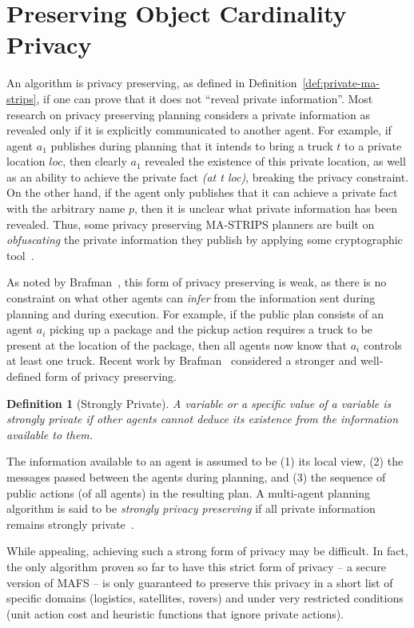 \documentclass[letterpaper]{article}
\newtheorem{definition}{Definition}
\theoremstyle{definition}
\begin{document}
\section{Preserving Object Cardinality Privacy }
\label{sec:preserving}

An algorithm is privacy preserving, as defined in Definition~\ref{def:private-ma-strips}, if one can prove that it does not ``reveal private information''. Most research on privacy preserving planning considers a private information as revealed only if it is explicitly communicated to another agent. For example, if agent $a_1$ publishes during planning that it intends to bring a truck $t$ to a private location $loc$, then clearly $a_1$ revealed the existence of this private location, as well as an ability to achieve the private fact {\em (at t loc)}, breaking  the privacy constraint. On the other hand, if the agent only publishes that it can achieve a private fact with the arbitrary name $p$, then it is unclear what private information has been revealed. Thus, some privacy preserving MA-STRIPS planners are built on {\em obfuscating} the private information they publish by applying some cryptographic tool~\cite{luis2014planMerging,Luis2015PMR,Borrajo2015MAPR_CMAP}.

As noted by Brafman~, this form of privacy preserving is weak, as there is no constraint on what other agents can {\em infer} from the information sent during planning and during execution. For example, if the public plan consists of an agent $a_i$ picking up a package and the pickup action requires a truck to be present at the location of the package, then all agents now know that $a_i$ controls at least one truck. Recent work by Brafman~ considered a stronger and well-defined form of privacy preserving.
\begin{definition}[Strongly Private]
A variable or a specific value of a variable is {\em strongly private} if  other agents cannot deduce its existence from the information available to them.
\label{def:strong-private}
\end{definition}
The information available to an agent is assumed to be (1) its local view, (2) the messages passed between the agents during planning, and (3) the sequence of public actions (of all agents) in the resulting plan. A multi-agent planning algorithm is said to be {\em strongly privacy preserving} if all private information remains strongly private~\cite{Brafman15}.

While appealing, achieving such a strong form of privacy may be difficult. In fact, the only algorithm proven so far to have this strict form of privacy -- a secure version of MAFS -- is only guaranteed to preserve this privacy in a short list of specific domains (logistics, satellites, rovers) and under very restricted conditions (unit action cost and heuristic functions that ignore private actions).
\end{document}
